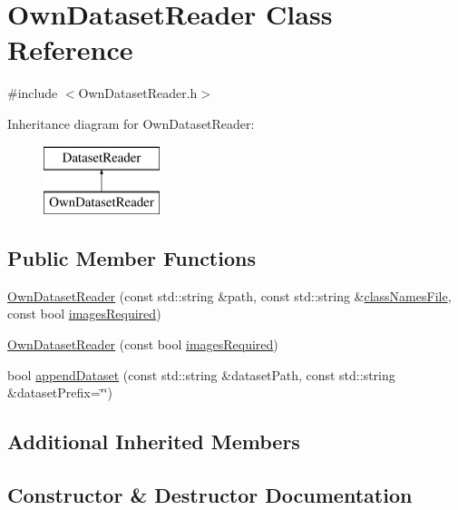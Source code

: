 \hypertarget{class_own_dataset_reader}{}\section{Own\+Dataset\+Reader Class Reference}
\label{class_own_dataset_reader}


{\ttfamily \#include $<$Own\+Dataset\+Reader.\+h$>$}

Inheritance diagram for Own\+Dataset\+Reader\+:\begin{figure}[H]
\begin{center}
\leavevmode
\includegraphics[height=2.000000cm]{class_own_dataset_reader}
\end{center}
\end{figure}
\subsection*{Public Member Functions}
\begin{DoxyCompactItemize}
\item 
\hyperlink{class_own_dataset_reader_ac6307c8d373b58b757864594132e2973}{Own\+Dataset\+Reader} (const std\+::string \&path, const std\+::string \&\hyperlink{class_dataset_reader_a45ded43b56539f1e37a24ca9c94b4611}{class\+Names\+File}, const bool \hyperlink{class_dataset_reader_a71d04d25d58e0e9a0c05d69afcff03a1}{images\+Required})
\item 
\hyperlink{class_own_dataset_reader_afdc8088f6fa4482075c3c61bd2b96aab}{Own\+Dataset\+Reader} (const bool \hyperlink{class_dataset_reader_a71d04d25d58e0e9a0c05d69afcff03a1}{images\+Required})
\item 
bool \hyperlink{class_own_dataset_reader_aaae1790f8ee3efd504fbf17ec717b640}{append\+Dataset} (const std\+::string \&dataset\+Path, const std\+::string \&dataset\+Prefix=\char`\"{}\char`\"{})
\end{DoxyCompactItemize}
\subsection*{Additional Inherited Members}


\subsection{Constructor \& Destructor Documentation}
\mbox{\label{class_own_dataset_reader_ac6307c8d373b58b757864594132e2973}} 
